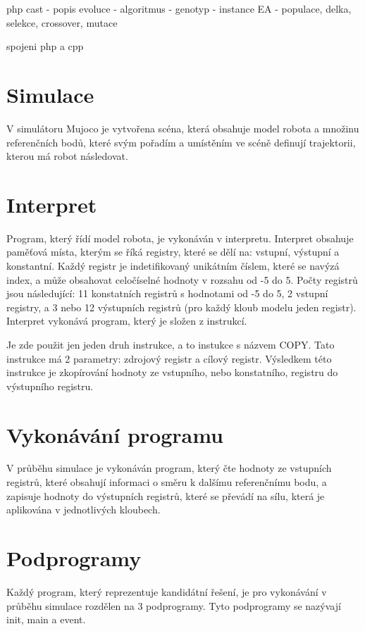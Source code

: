 php cast
- popis evoluce
- algoritmus
- genotyp
- instance EA - populace, delka, selekce, crossover, mutace

spojeni php a cpp

\section{Simulace}

V simulátoru Mujoco je vytvořena scéna, která obsahuje model robota a množinu referenčních bodů, které svým pořadím a umístěním ve scéně definují trajektorii, kterou má robot následovat.


\section{Interpret}

Program, který řídí model robota, je vykonáván v interpretu.
Interpret obsahuje paměťová místa, kterým se říká registry, které se dělí na: vstupní, výstupní a konstantní.
Každý registr je indetifikovaný unikátním číslem, které se navýzá index, a může obsahovat celočíselné hodnoty v rozsahu od -5 do 5.
Počty registrů jsou následující: 11 konstatních registrů s hodnotami od -5 do 5, 2 vstupní registry, a 3 nebo 12 výstupních registrů (pro každý kloub modelu jeden registr).
Interpret vykonává program, který je složen z instrukcí.

Je zde použit jen jeden druh instrukce, a to instukce s názvem COPY.
Tato instrukce má 2 parametry: zdrojový registr a cílový registr.
Výsledkem této instrukce je zkopírování hodnoty ze vstupního, nebo konstatního, registru do výstupního registru.

\section{Vykonávání programu}

V průběhu simulace je vykonáván program, který čte hodnoty ze vstupních registrů, které obsahují informaci o směru k dalšímu referenčnímu bodu, a zapisuje hodnoty do výstupních registrů, které se převádí na sílu, která je aplikována v jednotlivých kloubech.

\section{Podprogramy}

Každý program, který reprezentuje kandidátní řešení, je pro vykonávání v průběhu simulace rozdělen na 3 podprogramy.
Tyto podprogramy se nazývají init, main a event.

